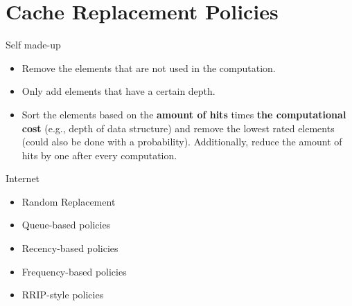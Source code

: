 \section{Cache Replacement Policies}

Self made-up
\begin{itemize}
  \item Remove the elements that are not used in the computation.
  \item Only add elements that have a certain depth.
  \item Sort the elements based on the \textbf{amount of hits} times \textbf{the computational cost} (e.g., depth of data structure) and remove the lowest rated elements (could also be done with a probability). Additionally, reduce the amount of hits by one after every computation.
\end{itemize}

Internet
\begin{itemize}
  \item Random Replacement
  \item Queue-based policies
  \item Recency-based policies
  \item Frequency-based policies
  \item RRIP-style policies
\end{itemize}


